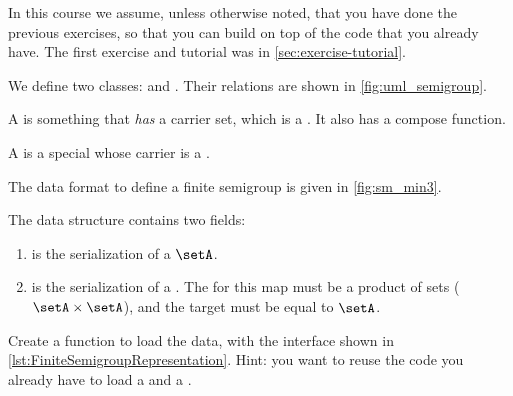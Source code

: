 
\begin{remark}
    In this course we assume, unless otherwise noted, that you have done the previous exercises, so that you can build on top of the code that you already have.
    The first exercise and tutorial was in \cref{sec:exercise-tutorial}.
\end{remark}

\begin{figure*}[b]
    \label{fig:uml_semigroup}
\end{figure*}

We define two classes: \Semigroup and \FiniteSemigroup.
Their relations are shown in \cref{fig:uml_semigroup}.

A \Semigroup is something that \emph{has} a carrier set, which is a \Setoid.
It also has a compose function.


A \FiniteSemigroup is a special \Semigroup whose carrier is a \FiniteSet.


\begin{marginfigure}%
    \caption{}%
    \label{fig:sm_min3}%
\end{marginfigure}%

The data format to define a finite semigroup is given in \cref{fig:sm_min3}.

The data structure contains two fields:
\begin{enumerate}
    \item {} is the serialization of a \FiniteSet $\setA$.
    \item {} is the serialization of a \FiniteMap.
          The  for this map must be a product of sets ($\setA \times \setA$), and the target must be equal to $\setA$.
\end{enumerate}

\begin{codeexercise}
    \label{ex:TestFiniteSemigroupRepresentation}
    Create a function to load the data, with the interface shown in \cref{lst:FiniteSemigroupRepresentation}.
    Hint: you want to reuse the code you already have to load a \FiniteSet and a \FiniteMap.
\end{codeexercise}




